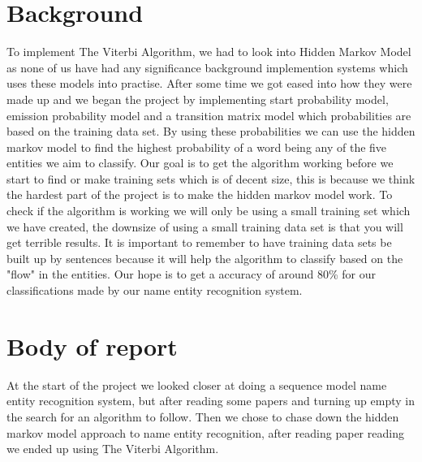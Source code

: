 \documentclass{article}
\begin{document}
\section{Background}
To implement The Viterbi Algorithm, we had to look into Hidden Markov Model as none of us have had any significance background implemention systems which uses these models into practise. After some time we got eased into how they were made up and we began the project by implementing start probability model, emission probability model and a transition matrix model which probabilities are based on the training data set. By using these probabilities we can use the hidden markov model to find the highest probability of a word being any of the five entities we aim to classify. Our goal is to get the algorithm working before we start to find or make training sets which is of decent size, this is because we think the hardest part of the project is to make the hidden markov model work. To check if the algorithm is working we will only be using a small training set which we have created, the downsize of using a small training data set is that you will get terrible results. It is important to remember to have training data sets be built up by sentences because it will help the algorithm to classify based on the "flow" in the entities. Our hope is to get a accuracy of around 80\% for our classifications made by our name entity recognition system.


\section{Body of report}
At the start of the project we looked closer at doing a sequence model name entity recognition system, but after reading some papers and turning up empty in the search for an algorithm to follow. Then we chose to chase down the hidden markov model approach to name entity recognition, after reading paper reading we ended up using The Viterbi Algorithm.
\end{document}

